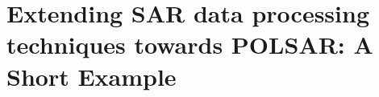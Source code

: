 \documentclass[journal]{IEEEtran}
\begin{document}
%

\section{Extending SAR data processing techniques towards POLSAR: A Short Example}
\label{sec:application}

%
\end{document}
